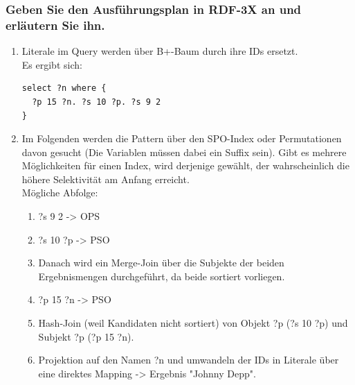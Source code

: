 \documentclass[11pt,a4paper]{scrartcl}
\begin{document}
\subsubsection*{Geben Sie den Ausführungsplan in RDF-3X an und erläutern Sie ihn.}
\begin{enumerate}
\item Literale im Query werden über B+-Baum durch ihre IDs ersetzt.\\
Es ergibt sich:
\begin{verbatim}
select ?n where {
  ?p 15 ?n. ?s 10 ?p. ?s 9 2
}
\end{verbatim}
\item Im Folgenden werden die Pattern über den SPO-Index oder Permutationen davon gesucht (Die Variablen müssen dabei ein Suffix sein). Gibt es mehrere Möglichkeiten für einen Index, wird derjenige gewählt, der wahrscheinlich die höhere Selektivität am Anfang erreicht.\\
Mögliche Abfolge:\\
\begin{enumerate}
\item ?s 9 2 -> OPS
\item ?s 10 ?p -> PSO
\item Danach wird ein Merge-Join über die Subjekte der beiden Ergebnismengen durchgeführt, da beide sortiert vorliegen.
\item ?p 15 ?n -> PSO
\item Hash-Join (weil Kandidaten nicht sortiert) von Objekt ?p (?s 10 ?p) und Subjekt ?p (?p 15 ?n).
\item Projektion auf den Namen ?n und umwandeln der IDs in Literale über eine direktes Mapping -> Ergebnis "Johnny Depp".
\end{enumerate}
\end{enumerate}
\end{document}
